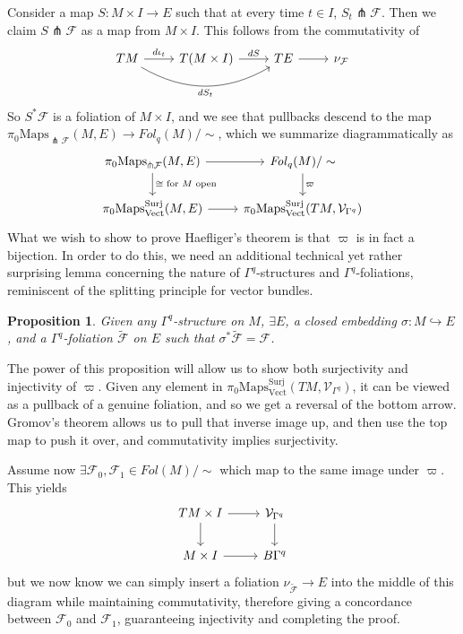 \documentclass{article}
\newtheorem{proposition}[theorem]{Proposition}
\newtheorem{proposed work}[theorem]{Proposed Work}
\theoremstyle{definition}
\begin{document}
Consider a map $S:M \times I \rightarrow E$ such that at every time $t \in I$, $S_t \pitchfork \mathcal{F}$. Then we claim $S \pitchfork \mathcal{F}$ as a map from $M \times I$. This follows from the commutativity of 
\[  \begin{tikzcd}
    TM \ar[r, "d\iota_t"]
 \ar[rr, "dS_t"',bend right]& T(M\times I) \ar[r,"dS"] & TE \ar[r] & \nu_\mathcal{F}
  \end{tikzcd}
\]
So $S^*\mathcal{F}$ is a foliation of $M \times I$, and we see that pullbacks descend to the map $\pi_0\mathrm{Maps}_{\pitchfork\mathcal{F}}(M,E) \rightarrow \mathit{Fol}_q(M)/\sim$, which we summarize diagrammatically as
\[  \begin{tikzcd}
    \pi_0\mathrm{Maps}_{\pitchfork\mathcal{F}}(M,E) \ar[r]
    \ar[d,"\cong \text{ for }M \text{ open}" hookrightarrow]
 &
    \mathit{Fol}_q(M)/\sim
    \ar[d, "\varpi"] \\
    \pi_0\mathrm{Maps}^{\mathrm{Surj}}_{\mathrm{Vect}}(M,E) \ar[r, rightarrow] &
    \pi_0\mathrm{Maps}^{\mathrm{Surj}}_{\mathrm{Vect}}(TM,\mathcal{V}_{\Gamma^q}) 
  \end{tikzcd}
\]
What we wish to show to prove Haefliger's theorem is that $\varpi$ is in fact a bijection. In order to do this, we need an additional technical yet rather surprising lemma concerning the nature of $\Gamma^q$-structures and $\Gamma^q$-foliations, reminiscent of the splitting principle for vector bundles.

\begin{proposition}
\label{foliationembedding}
Given any $\Gamma^q$-structure on $M$, $\exists E$, a closed embedding $\sigma:M \hookrightarrow E$, and a $\Gamma^q$-foliation $\mathcal{\tilde{F}}$ on $E$ such that $\sigma^*\mathcal{\tilde{F}} = \mathcal{F}$.
\end{proposition}

The power of this proposition will allow us to show both surjectivity and injectivity of $\varpi$. Given any element in $\pi_0\mathrm{Maps}^{\mathrm{Surj}}_{\mathrm{Vect}}(TM,\mathcal{V}_{\Gamma^q})$, it can be viewed as a pullback of a genuine foliation, and so we get a reversal of the bottom arrow. Gromov's theorem allows us to pull that inverse image up, and then use the top map to push it over, and commutativity implies surjectivity. 

Assume now $\exists \mathcal{F}_0,\mathcal{F}_1 \in \mathit{Fol}(M)/\sim$ which map to the same image under $\varpi$. This yields
\[  \begin{tikzcd}
    TM \times I \ar[r]
    \ar[d] &
	\mathcal{V}_{\Gamma^q}
    \ar[d] \\
    M \times I \ar[r] &
    B\Gamma^q
  \end{tikzcd}
\]
but we now know we can simply insert a foliation $\nu_\mathcal{\tilde{F}} \rightarrow E$ into the middle of this diagram while maintaining commutativity, therefore giving a concordance between $\mathcal{F}_0$ and $\mathcal{F}_1$, guaranteeing injectivity and completing the proof.
\end{document}
